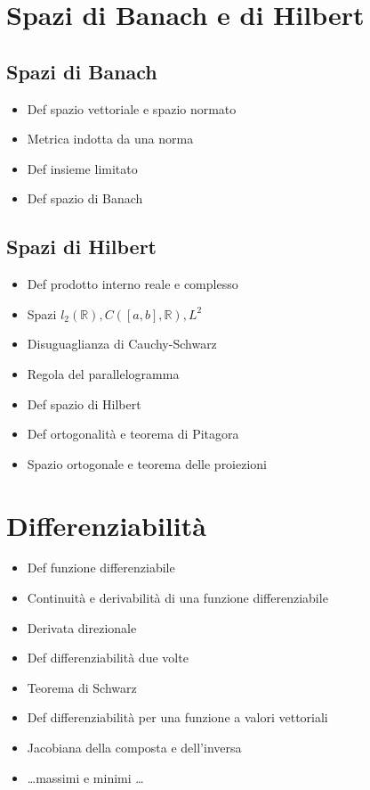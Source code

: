 \documentclass[10pt,a4paper, twocolumn]{article}
\newcommand{\R}{\mathbb{R}}
\renewcommand{\,}{\text{, }}
\begin{document}
\section{Spazi di Banach e di Hilbert}
\subsection{Spazi di Banach}
\begin{itemize}
    \item Def spazio vettoriale e spazio normato
    \item Metrica indotta da una norma
    \item Def insieme limitato
    \item Def spazio di Banach
\end{itemize}
\subsection{Spazi di Hilbert}
\begin{itemize}
    \item Def prodotto interno reale e complesso
    \item Spazi $l_2(\R), C([a,b],\R), L^2$
    \item Disuguaglianza di Cauchy-Schwarz
    \item Regola del parallelogramma
    \item Def spazio di Hilbert
    \item Def ortogonalità e teorema di Pitagora
    \item Spazio ortogonale e teorema delle proiezioni
\end{itemize}

\section{Differenziabilità}
\begin{itemize}
    \item Def funzione differenziabile
    \item Continuità e derivabilità di una funzione differenziabile
    \item Derivata direzionale
    \item Def differenziabilità due volte
    \item Teorema di Schwarz
    \item Def differenziabilità per una funzione a valori vettoriali
    \item Jacobiana della composta e dell'inversa
    \item \dots massimi e minimi \dots
\end{itemize}
\end{document}
